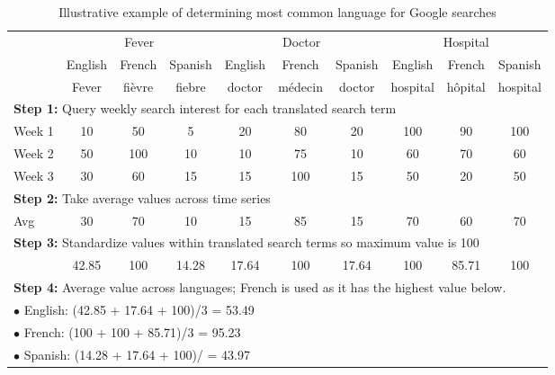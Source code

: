 \documentclass{article}
\begin{document}
\begin{table}[H]
\caption{Illustrative example of determining most common language for Google searches}
\label{tab:ill_ex}
\begin{tabular}{l ccc | ccc | ccc}
\hline
 & \multicolumn{3}{c|}{Fever} & \multicolumn{3}{c|}{Doctor} & \multicolumn{3}{c}{Hospital} \\
 & English & French & Spanish & English & French & Spanish & English & French & Spanish \\
\hline
   & Fever & fièvre & fiebre & doctor & médecin & doctor & hospital & hôpital & hospital \\
\hline
\multicolumn{10}{l}{{\bf Step 1:} Query weekly search interest for each translated search term} \\
Week 1    & 10    & 50     & 5      & 20     & 80      & 20     & 100      & 90      & 100      \\    
Week 2    & 50    & 100    & 10     & 10     & 75      & 10     & 60       & 70      & 60       \\    
Week 3    & 30    & 60     & 15     & 15     & 100     & 15     & 50       & 20      & 50       \\  
\hline
\multicolumn{10}{l}{{\bf Step 2:} Take average values across time series} \\
Avg & 30    & 70     & 10      & 15     & 85      & 15     & 70      & 60       & 70 \\
\hline
\multicolumn{10}{l}{{\bf Step 3:} Standardize values within translated search terms so maximum value is 100} \\
    & 42.85 & 100    & 14.28   & 17.64  & 100     & 17.64  & 100     & 85.71    & 100 \\  
\hline

\multicolumn{10}{l}{{\bf Step 4:} Average value across languages; French is used as it has the highest value below.} \\

\multicolumn{10}{l}{    $ \bullet $  English: (42.85 + 17.64 + 100)/3 = 53.49} \\
\multicolumn{10}{l}{   $ \bullet $   French: (100 + 100 + 85.71)/3 = 95.23} \\
\multicolumn{10}{l}{ $ \bullet $     Spanish: (14.28 + 17.64 + 100)/ = 43.97} \\
\hline
\end{tabular} 
\end{table}

\scriptsize

\normalsize
\end{document}
